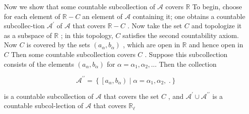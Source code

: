 \begin{centeredblock}
\begin{example}
Now we show that some countable subcollection of \(\mathcal{A}\) covers \(\mathbb{R}\) To begin, choose for each element of \(\mathbb{R} - C\) an element of \(\mathcal{A}\) containing it; one obtains a countable subcollec-tion \({\mathcal{A}}^{\prime }\) of \(\mathcal{A}\) that covers \(\mathbb{R} - C\) . Now take the set \(C\) and topologize it as a subspace of \(\mathbb{R}\) ; in this topology, \(C\) satisfies the second countability axiom. Now \(C\) is covered by the sets \(\left( {{a}_{\alpha },{b}_{\alpha }}\right)\) , which are open in \(\mathbb{R}\) and hence open in \(C\) Then some countable subcollection covers \(C\) . Suppose this subcollection consists of the elements \(\left( {{a}_{\alpha },{b}_{\alpha }}\right)\) for \(\alpha  = {\alpha }_{1},{\alpha }_{2},\ldots\) Then the collection

\[
{\mathcal{A}}^{\prime \prime } = \left\{  {\left\lbrack  {{a}_{\alpha },{b}_{\alpha }}\right)  \mid  \alpha  = {\alpha }_{1},{\alpha }_{2},\;.}\right\}
\]


is a countable subcollection of \(\mathcal{A}\) that covers the set \(C\) , and \({\mathcal{A}}^{\prime } \cup  {\mathcal{A}}^{\prime \prime }\) is a countable subcol-lection of \(\mathcal{A}\) that covers \({\mathbb{R}}_{\ell }\)
\end{example}
\end{centeredblock}

